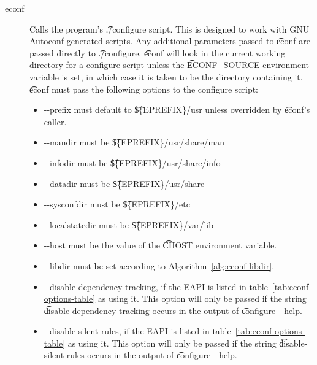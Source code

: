 \begin{description}
\item[econf] Calls the program's \t{./configure} script. This is designed to work with GNU
    Autoconf-generated scripts. Any additional parameters passed to \t{econf} are passed directly
    to \t{./configure}. \t{econf} will look in the current working directory for a configure script
    unless the \t{ECONF\_SOURCE} environment variable is set, in which case it is taken to be the
    directory containing it. \t{econf} must pass the following options to the configure script:

    \begin{itemize}
    \item -{}-prefix must default to \t{\$\{EPREFIX\}/usr} unless overridden by \t{econf}'s caller.
    \item -{}-mandir must be \t{\$\{EPREFIX\}/usr/share/man}
    \item -{}-infodir must be \t{\$\{EPREFIX\}/usr/share/info}
    \item -{}-datadir must be \t{\$\{EPREFIX\}/usr/share}
    \item -{}-sysconfdir must be \t{\$\{EPREFIX\}/etc}
    \item -{}-localstatedir must be \t{\$\{EPREFIX\}/var/lib}
    \item -{}-host must be the value of the \t{CHOST} environment variable.
    \item -{}-libdir must be set according to Algorithm~\ref{alg:econf-libdir}.
    \item -{}-disable-dependency-tracking, if the EAPI is listed in
        table~\ref{tab:econf-options-table} as using it. This option will only be passed if the
        string \t{disable-dependency-tracking} occurs in the output of \t{configure -{}-help}.
    \item -{}-disable-silent-rules, if the EAPI is listed in
        table~\ref{tab:econf-options-table} as using it. This option will only be passed if the
        string \t{disable-silent-rules} occurs in the output of \t{configure -{}-help}.
    \end{itemize}


\end{description}
